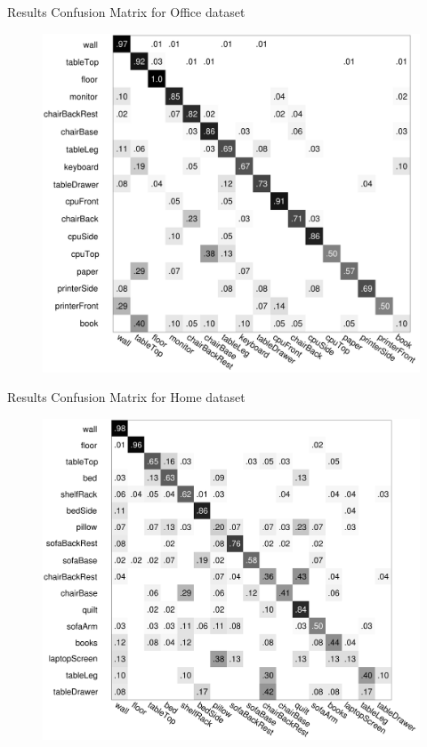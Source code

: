 \documentclass{beamer}
\begin{document}
\begin{frame}{Results}
Confusion Matrix for Office dataset
  \begin{figure}
		\includegraphics[scale=0.2]{objassoc_office_radius0_6.pdf} 
	\end{figure}

\end{frame}

\begin{frame}{Results}
Confusion Matrix for Home dataset
 \begin{figure}   
 \includegraphics[scale=0.2]{objassoc_home_radius0_6.pdf} 
 \end{figure}
\end{frame}
\end{document}
